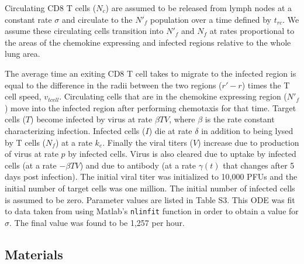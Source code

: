 \documentclass[preprint,10pt,numbers]{elsarticle}
\begin{document}
Circulating CD8 T cells ($N_{c}$) are assumed to be released from lymph nodes at a constant rate $\sigma$ and circulate to the $N'_{f}$ population over a time defined by $t_{rc}$. We assume these circulating cells transition into $N'_{f}$ and $N_{f}$ at rates proportional to the areas of the chemokine expressing and infected regions relative to the whole lung area. 

The average time an exiting CD8 T cell takes to migrate to the infected region is equal to the difference in the radii between the two regions ($r' - r$) times the T cell speed, $v_{tcell}$.  Circulating cells that are in the chemokine expressing region ($N'_{f}$) move into the infected region after performing chemotaxis for that time. Target cells ($T$) become infected by virus at rate $\beta TV$, where $\beta$ is the rate constant characterizing infection. Infected cells ($I$) die at rate $\delta$ in addition to being lysed by T cells ($N_{f}$) at a rate $k_{e}$. Finally the viral titers ($V$) increase due to production of virus at rate $p$ by infected cells. Virus is also cleared due to uptake by infected cells (at a rate $- \beta TV$) and due to antibody (at a rate $\gamma (t)$ that changes after 5 days post infection). The initial viral titer was initialized to 10,000 PFUs and the initial number of target cells was one million. The initial number of infected cells is assumed to be zero. Parameter values are listed in Table S3.  This ODE was fit to data taken from \citep{Miao2010a} using Matlab's \texttt{nlinfit} function in order to obtain a value for $\sigma$.  The final value was found to be 1,257 per hour.


\subsection*{Materials}
\end{document}

